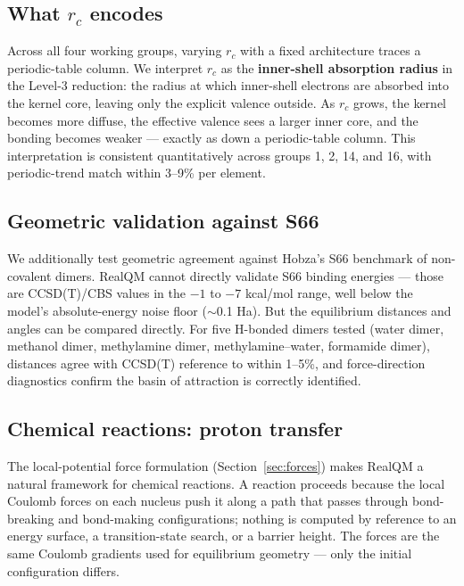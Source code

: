 \documentclass[11pt]{article}
\begin{document}
\subsection{What $r_c$ encodes}

Across all four working groups, varying $r_c$ with a fixed architecture traces a periodic-table column. We interpret $r_c$ as the \textbf{inner-shell absorption radius} in the Level-3 reduction: the radius at which inner-shell electrons are absorbed into the kernel core, leaving only the explicit valence outside. As $r_c$ grows, the kernel becomes more diffuse, the effective valence sees a larger inner core, and the bonding becomes weaker --- exactly as down a periodic-table column. This interpretation is consistent quantitatively across groups 1, 2, 14, and 16, with periodic-trend match within 3--9\% per element.

\subsection{Geometric validation against S66}

We additionally test geometric agreement against Hobza's S66 benchmark of non-covalent dimers. RealQM cannot directly validate S66 binding energies --- those are CCSD(T)/CBS values in the $-1$ to $-7$ kcal/mol range, well below the model's absolute-energy noise floor ($\sim$0.1 Ha). But the equilibrium distances and angles can be compared directly. For five H-bonded dimers tested (water dimer, methanol dimer, methylamine dimer, methylamine--water, formamide dimer), distances agree with CCSD(T) reference to within 1--5\%, and force-direction diagnostics confirm the basin of attraction is correctly identified.

\subsection{Chemical reactions: proton transfer}\label{sec:reactions}

The local-potential force formulation (Section~\ref{sec:forces}) makes RealQM a natural framework for chemical reactions. A reaction proceeds because the local Coulomb forces on each nucleus push it along a path that passes through bond-breaking and bond-making configurations; nothing is computed by reference to an energy surface, a transition-state search, or a barrier height. The forces are the same Coulomb gradients used for equilibrium geometry --- only the initial configuration differs.
\end{document}
